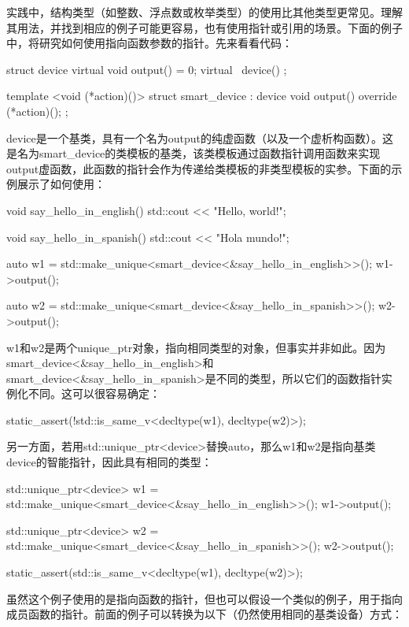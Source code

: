 实践中，结构类型（如整数、浮点数或枚举类型）的使用比其他类型更常见。理解其用法，并找到相应的例子可能更容易，也有使用指针或引用的场景。下面的例子中，将研究如何使用指向函数参数的指针。先来看看代码：

\begin{cpp}
struct device
{
	virtual void output() = 0;
	virtual ~device() {}
};

template <void (*action)()>
struct smart_device : device
{
	void output() override
	{
		(*action)();
	}
};
\end{cpp}

device是一个基类，具有一个名为output的纯虚函数（以及一个虚析构函数）。这是名为smart\_device的类模板的基类，该类模板通过函数指针调用函数来实现output虚函数，此函数的指针会作为传递给类模板的非类型模板的实参。下面的示例展示了如何使用：

\begin{cpp}
void say_hello_in_english()
{
	std::cout << "Hello, world!\n";
}

void say_hello_in_spanish()
{
	std::cout << "Hola mundo!\n";
}

auto w1 =
	std::make_unique<smart_device<&say_hello_in_english>>();
w1->output();

auto w2 =
	std::make_unique<smart_device<&say_hello_in_spanish>>();
w2->output();
\end{cpp}

w1和w2是两个unique\_ptr对象，指向相同类型的对象，但事实并非如此。因为smart\_device<\&say\_hello\_in\_english>和smart\_device<\&say\_hello\_in\_spanish>是不同的类型，所以它们的函数指针实例化不同。这可以很容易确定：

\begin{cpp}
static_assert(!std::is_same_v<decltype(w1), decltype(w2)>);
\end{cpp}

另一方面，若用std::unique\_ptr<device>替换auto，那么w1和w2是指向基类device的智能指针，因此具有相同的类型：

\begin{cpp}
std::unique_ptr<device> w1 =
	std::make_unique<smart_device<&say_hello_in_english>>();
w1->output();

std::unique_ptr<device> w2 =
	std::make_unique<smart_device<&say_hello_in_spanish>>();
w2->output();

static_assert(std::is_same_v<decltype(w1), decltype(w2)>);
\end{cpp}

虽然这个例子使用的是指向函数的指针，但也可以假设一个类似的例子，用于指向成员函数的指针。前面的例子可以转换为以下（仍然使用相同的基类设备）方式：

